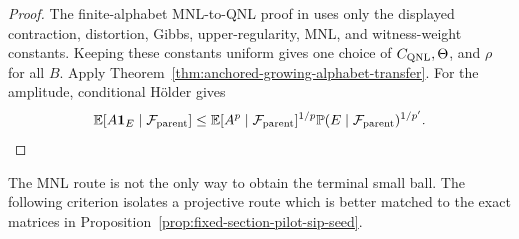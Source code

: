 \documentclass[11pt]{article}
\newcommand{\one}{\mathbf 1}
\begin{document}
\begin{proof}
The finite-alphabet MNL-to-QNL proof in
\cite[Section~6.1]{LPS} uses only the displayed contraction,
distortion, Gibbs, upper-regularity, MNL, and witness-weight constants.  Keeping these
constants uniform gives one choice of $C_{\rm QNL},\Theta$, and $\rho$ for
all $B$.  Apply Theorem~\ref{thm:anchored-growing-alphabet-transfer}.  For
the amplitude, conditional H\"older gives
\[
 \mathbb E[A\one_E\mid\mathcal F_{\rm parent}]
 \le
 \mathbb E[A^p\mid\mathcal F_{\rm parent}]^{1/p}
 \mathbb P(E\mid\mathcal F_{\rm parent})^{1/p'}.
\]
\end{proof}

The MNL route is not the only way to obtain the terminal small ball.  The
following criterion isolates a projective route which is better matched to
the exact matrices in
Proposition~\ref{prop:fixed-section-pilot-sip-seed}.
\end{document}

